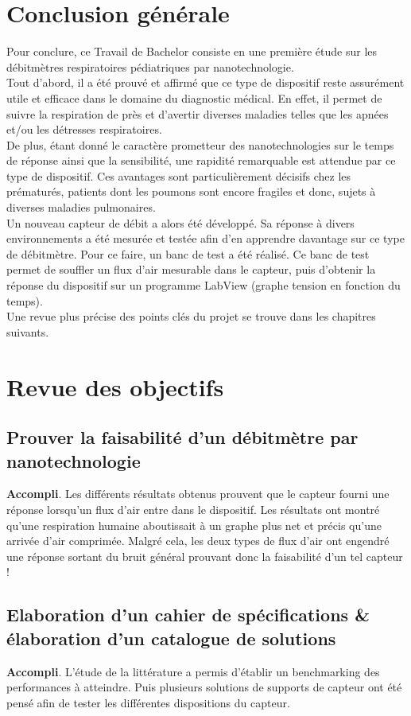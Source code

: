 \section{Conclusion générale}
Pour conclure, ce Travail de Bachelor consiste en une première étude sur les débitmètres respiratoires pédiatriques par nanotechnologie. \\
Tout d'abord, il a été prouvé et affirmé que ce type de dispositif reste assurément utile et efficace dans le domaine du diagnostic médical. 
En effet, il permet de suivre la respiration de près et d'avertir diverses maladies telles que les apnées et/ou les détresses respiratoires. \\
De plus, étant donné le caractère prometteur des nanotechnologies sur le temps de réponse ainsi que la sensibilité, une rapidité remarquable 
est attendue par ce type de dispositif. Ces avantages sont particulièrement décisifs chez les prématurés, patients dont les poumons sont encore 
fragiles et donc, sujets à diverses maladies pulmonaires.\\
Un nouveau capteur de débit a alors été développé. Sa réponse à divers environnements a été mesurée et testée afin d'en apprendre davantage sur 
ce type de débitmètre. Pour ce faire, un banc de test a été réalisé. Ce banc de test permet de souffler un flux d'air mesurable dans 
le capteur, puis d'obtenir la réponse du dispositif sur un programme LabView (graphe tension en fonction du temps). \\

Une revue plus précise des points clés du projet se trouve dans les chapitres suivants. 

\section{Revue des objectifs}
\subsection{Prouver la faisabilité d'un débitmètre par nanotechnologie}
\textbf{Accompli}. Les différents résultats obtenus prouvent que le capteur fourni une réponse lorsqu'un flux d'air entre dans le dispositif. Les 
résultats ont montré qu'une respiration humaine aboutissait à un graphe plus net et précis qu'une arrivée d'air comprimée. Malgré cela, 
les deux types de flux d'air ont engendré une réponse sortant du bruit général prouvant donc la faisabilité d'un tel capteur !

\subsection{Elaboration d'un cahier de spécifications \& élaboration d'un catalogue de solutions}
\textbf{Accompli}. L'étude de la littérature a permis d'établir un benchmarking des performances à atteindre. Puis plusieurs solutions de supports de capteur 
ont été pensé afin de tester les différentes dispositions du capteur. 

